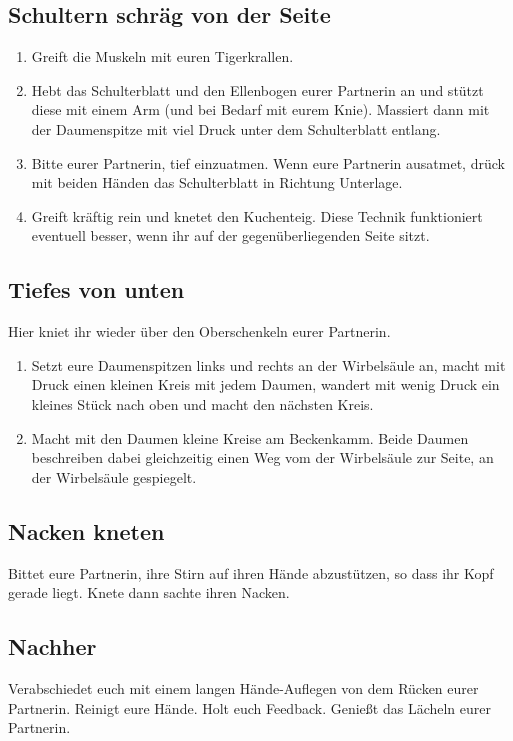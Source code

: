 \subsection{Schultern schräg von der Seite}
\begin{enumerate}
	\item {} Greift die Muskeln mit euren Tigerkrallen.
	\item {} Hebt das Schulterblatt und den Ellenbogen eurer Partnerin an und stützt diese mit einem Arm (und bei Bedarf mit eurem Knie). Massiert dann mit der Daumenspitze mit viel Druck unter dem Schulterblatt entlang.
	\item {} Bitte eurer Partnerin, tief einzuatmen. Wenn eure Partnerin ausatmet, drück mit beiden Händen das Schulterblatt in Richtung Unterlage.
	\item {} Greift kräftig rein und knetet den Kuchenteig. Diese Technik funktioniert eventuell besser, wenn ihr auf der gegenüberliegenden Seite sitzt.
\end{enumerate}


\subsection{Tiefes von unten}

Hier kniet ihr wieder über den Oberschenkeln eurer Partnerin.

\begin{enumerate}
	\item {} Setzt eure Daumenspitzen links und rechts an der Wirbelsäule an, macht mit Druck einen kleinen Kreis mit jedem Daumen, wandert mit wenig Druck ein kleines Stück nach oben und macht den nächsten Kreis.
	\item {} Macht mit den Daumen kleine Kreise am Beckenkamm. Beide Daumen beschreiben dabei gleichzeitig einen Weg vom der Wirbelsäule zur Seite, an der Wirbelsäule gespiegelt.
\end{enumerate}


\subsection{Nacken kneten}

Bittet eure Partnerin, ihre Stirn auf ihren Hände abzustützen, so dass ihr Kopf gerade liegt. Knete dann sachte ihren Nacken.


\subsection{Nachher}

Verabschiedet euch mit einem langen Hände-Auflegen von dem Rücken eurer Partnerin. Reinigt eure Hände. Holt euch Feedback. Genießt das Lächeln eurer Partnerin.
